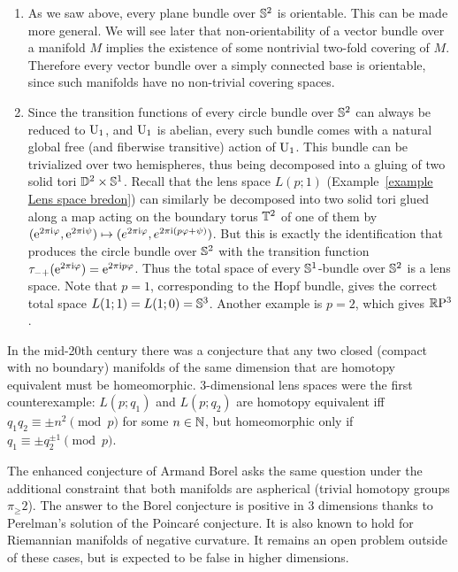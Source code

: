 \begin{example}\label{ex circle bundles over S2}
     \begin{enumerate}
        \item As we saw above, every plane bundle over $\mathbb{S}^2$ is orientable. This can be made more general. We will see later that non-orientability of a vector bundle over a manifold $M$ implies the existence of some nontrivial two-fold covering of $M$. Therefore every vector bundle over a simply connected base is orientable, since such manifolds have no non-trivial covering spaces.
        
        \item Since the transition functions of every circle bundle over $\mathbb{S}^2$ can always be reduced to $\operatorname{U}_1$, and $\operatorname{U}_1$ is abelian, every such bundle comes with a natural global free (and fiberwise transitive) action of $\operatorname{U}_1$. This bundle can be trivialized over two hemispheres, thus being decomposed into a gluing of two solid tori $\mathbb{D}^2\times \mathbb{S}^1$. Recall that the lens space $L(p;1)$ (Example~\ref{example Lens space bredon}) can similarly be decomposed into two solid tori glued along a map acting on the boundary torus $\mathbb{T}^2$ of one of them by $(\mathrm{e}^{2\pi\mathrm{i} \varphi},\mathrm{e}^{2\pi\mathrm{i}\psi})\mapsto (e^{2\pi\mathrm{i}\varphi},e^{2\pi\mathrm{i}(p\varphi+\psi)})$. But this is exactly the identification that produces the circle bundle over $\mathbb{S}^2$ with the transition function $\tau_{-+}(\mathrm{e}^{2\pi\mathrm{i}\varphi})=\mathrm{e}^{2\pi\mathrm{i} p\varphi}$. Thus the total space of every $\mathbb{S}^1$-bundle over $\mathbb{S}^2$ is a lens space. Note that $p=1$, corresponding to the Hopf bundle, gives the correct total space $L(1;1)=L(1;0)=\mathbb{S}^3$. Another example is $p=2$, which gives $\mathbb{R}\mathrm{P}^3$. 
    \end{enumerate}
\end{example}
   
\begin{rem}
    In the mid-20th century there was a conjecture that any two closed (compact with no boundary) manifolds of the same dimension that are homotopy equivalent must be homeomorphic. 3-dimensional lens spaces were the first counterexample: $L(p;q_1)$ and $L(p;q_2)$ are homotopy equivalent iff $q_1q_2\equiv \pm n^2\pmod{p}$ for some $n\in\mathbb{N}$, but homeomorphic only if $q_1\equiv \pm q_2^{\pm 1}\pmod{p}$.

    The enhanced conjecture of Armand Borel asks the same question under the additional constraint that both manifolds are aspherical (trivial homotopy groups $\pi_\geq 2$). The answer to the Borel conjecture is positive in 3 dimensions thanks to Perelman's solution of the Poincar\'e conjecture. It is also known to hold for Riemannian manifolds of negative curvature. It remains an open problem outside of these cases, but is expected to be false in higher dimensions.
\end{rem}


